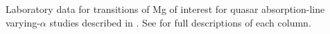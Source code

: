 Laboratory data for transitions of Mg of interest for quasar absorption-line varying-$\alpha$ studies described in . See  for full descriptions of each column.
